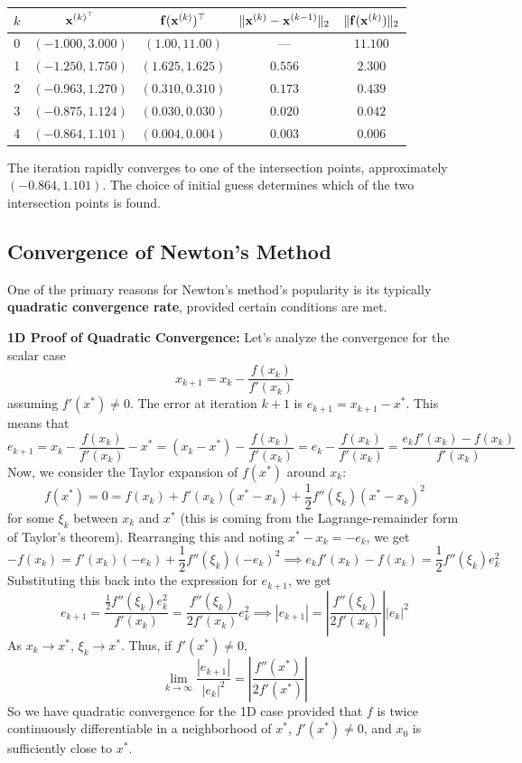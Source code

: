 \begin{exampleBox}
\begin{center}
\begin{tabular}{@{}ccccc@{}}
\toprule
$k$ & $\mathbf{x}^{(k)^\top}$ & $\mathbf{f}(\mathbf{x}^{(k)})^\top$ & $\|\mathbf{x}^{(k)}-\mathbf{x}^{(k-1)}\|_2$ & $\|\mathbf{f}(\mathbf{x}^{(k)})\|_2$ \\ \midrule
0 & $(-1.000, 3.000)$ & $(1.00, 11.00)$ & --- & $11.100$ \\
1 & $(-1.250, 1.750)$ & $(1.625, 1.625)$ & $0.556$ & $2.300$ \\
2 & $(-0.963, 1.270)$ & $(0.310, 0.310)$ & $0.173$ & $0.439$ \\
3 & $(-0.875, 1.124)$ & $(0.030, 0.030)$ & $0.020$ & $0.042$ \\
4 & $(-0.864, 1.101)$ & $(0.004, 0.004)$ & $0.003$ & $0.006$ \\
\bottomrule
\end{tabular}
\end{center}

The iteration rapidly converges to one of the intersection points, approximately $(-0.864, 1.101)$. The choice of initial guess determines which of the two intersection points is found.

\end{exampleBox}

\subsection{Convergence of Newton's Method}
One of the primary reasons for Newton's method's popularity is its typically \textbf{quadratic convergence rate}, provided certain conditions are met.

\textbf{1D Proof of Quadratic Convergence:}
Let's analyze the convergence for the scalar case 
\[
x_{k+1} = x_k - \frac{f(x_k)}{f'(x_k)}
\]
 assuming $f'(x^*) \neq 0$. The error at iteration $k+1$ is $e_{k+1} = x_{k+1} - x^*$. This means that
\[
    e_{k+1} = x_k - \frac{f(x_k)}{f'(x_k)} - x^* = (x_k - x^*) - \frac{f(x_k)}{f'(x_k)} = e_k - \frac{f(x_k)}{f'(x_k)}
    = \frac{e_k f'(x_k) - f(x_k)}{f'(x_k)}
\]
Now, we consider the Taylor expansion of $f(x^*)$ around $x_k$:
\[
    f(x^*) = 0 = f(x_k) + f'(x_k)(x^* - x_k) + \frac{1}{2}f''(\xi_k)(x^* - x_k)^2
\]
for some $\xi_k$ between $x_k$ and $x^*$ (this is coming from the Lagrange-remainder form of Taylor's theorem). Rearranging this and noting $x^* - x_k = -e_k$, we get
\[
    -f(x_k) = f'(x_k)(-e_k) + \frac{1}{2}f''(\xi_k)(-e_k)^2
    \implies
    e_k f'(x_k) - f(x_k) = \frac{1}{2}f''(\xi_k)e_k^2
\]
Substituting this back into the expression for $e_{k+1}$, we get
\[
    e_{k+1} = \frac{\frac{1}{2}f''(\xi_k)e_k^2}{f'(x_k)} = \frac{f''(\xi_k)}{2f'(x_k)} e_k^2
    \implies
    |e_{k+1}| = \left| \frac{f''(\xi_k)}{2f'(x_k)} \right| |e_k|^2
\]
As $x_k \to x^*$, $\xi_k \to x^*$. Thus, if $f'(x^*) \neq 0$,
\[
    \lim_{k\to\infty} \frac{|e_{k+1}|}{|e_k|^2} = \left| \frac{f''(x^*)}{2f'(x^*)} \right|
\]
So we have quadratic convergence for the 1D case provided that $f$ is twice continuously differentiable in a neighborhood of $x^*$, $f'(x^*) \neq 0$, and $x_0$ is sufficiently close to $x^*$.


